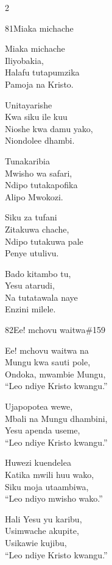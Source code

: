 \documentclass{article}
\begin{document}
\begin{multicols}{2}
\begin{hymn}{81}{Miaka michache}{}
\begin{stanza}
Miaka michache\\
Iliyobakia,\\
Halafu tutapumzika\\
Pamoja na Kristo.
\end{stanza}
\begin{chorus}
Unitayarishe\\
Kwa siku ile kuu\\
Nioshe kwa damu yako,\\
Niondolee dhambi.
\end{chorus}
\begin{stanza}
Tunakaribia\\
Mwisho wa safari,\\
Ndipo tutakapofika\\
Alipo Mwokozi.
\end{stanza}
\begin{stanza}
Siku za tufani\\
Zitakuwa chache,\\
Ndipo tutakuwa pale\\
Penye utulivu.
\end{stanza}
\begin{stanza}
Bado kitambo tu,\\
Yesu atarudi,\\
Na tutatawala naye\\
Enzini milele.
\end{stanza}
\end{hymn}

\begin{hymn}{82}{Ee! mchovu waitwa}{\#159}
\begin{stanza}
Ee! mchovu waitwa na\\
Mungu kwa sauti pole,\\
Ondoka, mwambie Mungu,\\
``Leo ndiye Kristo kwangu.''
\end{stanza}
\begin{stanza}
Ujapopotea wewe,\\
Mbali na Mungu dhambini,\\
Yesu apenda useme,\\
``Leo ndiye Kristo kwangu.''
\end{stanza}
\begin{stanza}
Huwezi kuendelea\\
Katika mwili huu wako,\\
Siku moja utaambiwa,\\
``Leo ndiyo mwisho wako.''
\end{stanza}
\begin{stanza}
Hali Yesu yu karibu,\\
Usimwache akupite,\\
Usikawie kujibu,\\
``Leo ndiye Kristo kwangu.''
\end{stanza}
\end{hymn}


\end{multicols}
\end{document}
